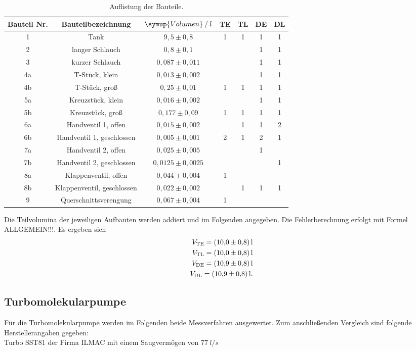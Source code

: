 \begin{table}[!hht]
	\centering
	\begin{tabular}{|c|c|c|c|c|c|c|}
		\hline
		Bauteil Nr. & Bauteilbezeichnung & {$\symup{Volumen} \:/\: l$}& TE & TL & DE & DL\\ \hline
		1	&	Tank & $9,5 \pm 0,8$ & 1 & 1 & 1 & 1 \\ \hline
		2	&	langer Schlauch & $0,8 \pm 0,1$ &  &  & 1 & 1 \\	\hline
		3	&	kurzer Schlauch & $0,087 \pm 0,011$ &  &  & 1 & 1 \\	\hline
		4a	&	T-Stück, klein & $0,013 \pm 0,002$ &  &  & 1 & 1 \\	\hline
		4b	&	T-Stück, groß & $0,25 \pm 0,01$ & 1 & 1 & 1 & 1 \\	\hline
		5a	&	Kreuzstück, klein & $0,016 \pm 0,002$ &  &  & 1 & 1 \\	\hline
		5b	&	Kreuzstück, groß & $0,177 \pm 0,09$ & 1 & 1 & 1 & 1 \\	\hline
		6a	&	Handventil 1, offen & $0,015 \pm 0,002$ &  & 1 & 1 & 2 \\	\hline
		6b	&	Handventil 1, geschlossen & $0,005 \pm 0,001$ &  2 & 1 & 2 & 1 \\	\hline
		7a	&	Handventil 2, offen & $0,025 \pm 0,005$ &  &  & 1 &  \\	\hline
		7b	&	Handventil 2, geschlossen & $0,0125 \pm 0,0025$ &  &  &  & 1 \\	\hline
		8a	&	Klappenventil, offen & $0,044 \pm 0,004$ & 1 &  &  &  \\	\hline
		8b	&	Klappenventil, geschlossen & $0,022 \pm 0,002$ &  & 1 & 1 & 1 \\	\hline
		9	&	Querschnittsverengung & $0,067 \pm 0,004$ & 1 &  &  &  \\	\hline
	\end{tabular}
	\caption{Auflistung der Bauteile.\cite{anleitung}}
	\label{tab:Bauteile}
\end{table}
Die Teilvolumina der jeweiligen Aufbauten werden addiert und im Folgenden angegeben. Die Fehlerberechnung erfolgt mit Formel ALLGEMEIN!!!.
Es ergeben sich
\begin{align*}
   V_\text{TE}=\SI{10,0 \pm 0,8}{l}\\
   V_\text{TL}=\SI{10,0 \pm 0,8}{l}\\
   V_\text{DE}=\SI{10,9 \pm 0,8}{l}\\
   V_\text{DL}=\SI{10,9 \pm 0,8}{l}.
\end{align*}

\subsection{Turbomolekularpumpe}
Für die Turbomolekularpumpe werden im Folgenden beide Messverfahren ausgewertet.
Zum anschließenden Vergleich sind folgende Herstellerangaben gegeben:\\
Turbo SST81 der Firma ILMAC mit einem Saugvermögen von $\SI{77}{l/s}$
